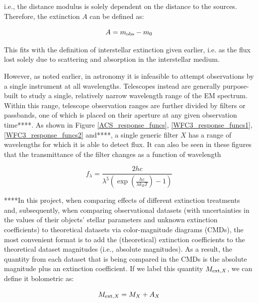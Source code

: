 \documentclass[12pt, a4paper]{report}
\begin{document}
i.e., the distance modulus is solely dependent on the distance to the  sources. Therefore, the extinction $A$ can be defined as:

\begin{equation}
\label{bol_extinc}
A = m_{\textnormal{obs}} - m_{0}
\end{equation}

This fits with the definition of interstellar extinction given earlier, i.e. as the flux lost solely due to scattering and absorption in the interstellar medium.

However, as noted earlier, in astronomy it is infeasible to attempt observations by a single instrument at all wavelengths. Telescopes instead are generally purpose-built to study a single, relatively narrow wavelength range of the EM spectrum. Within this range, telescope observation ranges are further divided by filters or passbands, one of which is placed on their aperture at any given observation time****. As shown in Figure \ref{ACS_response_funcs}, \ref{WFC3_response_funcs1}, \ref{WFC3_response_funcs2} and****, a single generic filter $X$ has a range of wavelengths for which it is able to detect flux. It can also be seen in these figures that the transmittance of the filter changes as a function of wavelength

\begin{equation}
f_{\lambda} = \frac{2hc}{\lambda^{5}\left(\exp\left({\frac{hc}{\lambda k_{B}T}}\right) - 1\right)}
\label{planck_bb}
\end{equation} 

****In this project, when comparing effects of different extinction treatments and, subsequently, when comparing observational datasets (with uncertainties in the values of their objects' stellar parameters and unknown extinction coefficients) to theoretical datasets via color-magnitude diagrams (CMDs), the most convenient format is to add the (theoretical) extinction coefficients to the theoretical dataset magnitudes (i.e., absolute magnitudes). As a result, the quantity from each dataset that is being compared in the CMDs is the absolute magnitude plus an extinction coefficient. If we label this quantity $M_{\textnormal{ext},X}$, we can define it bolometric as:

\begin{equation}
M_{\textnormal{ext},X} = M_{X} + A_{X}
\end{equation}
\end{document}
